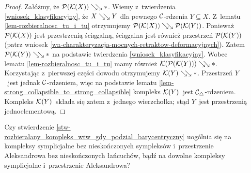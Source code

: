 \begin{proof}
Załóżmy, że $\mathcal{P}(\mathcal{K}(X))\searrow\!\!\searrow *$. Wiemy z~twierdzenia \ref{wniosek_klasyfikacyjny}, że $X\searrow\!\!\searrow Y$ dla pewnego $\mathcal{C}$-rdzenia $Y\subseteq X$. Z~lematu \ref{lem-rozbieralnosc_tu_i_tu} otrzymujemy $\mathcal{P}(\mathcal{K}(X))\searrow\!\!\searrow \mathcal{P}(\mathcal{K}(Y))$. Ponieważ $\mathcal{P}(\mathcal{K}(X))$ jest przestrzenią ściągalną, ściągalna jest również przestrzeń $\mathcal{P}(\mathcal{K}(Y))$ (patrz wniosek \ref{wn-charakteryzacja-mocnych-retraktow-deformacyjnych}). Zatem $\mathcal{P}(\mathcal{K}(Y))\searrow\!\!\searrow *$ na podstawie twierdzenia \ref{wniosek_klasyfikacyjny}. Wobec lematu \ref{lem-rozbieralnosc_tu_i_tu} mamy również $\mathcal{K}(\mathcal{P}(\mathcal{K}(Y)))\searrow\!\!\searrow *$. Korzystając z~pierwszej części dowodu otrzymujemy $\mathcal{K}(Y)\searrow\!\!\searrow *$. Przestrzeń $Y$~jest jednak $\mathcal{C}$-rdzeniem, więc na podstawie lematu \ref{lem-strong_collapsible_to_strong_collapsible} kompleks $\mathcal{K}(Y)$~jest $\mathcal{C}_\triangle$-rdzeniem. Kompleks $\mathcal{K}(Y)$~składa się zatem z~jednego wierzchołka; stąd $Y$~jest przestrzenią jednoelementową.
\end{proof}

\begin{problem}\label{prob4}
Czy stwierdzenie \ref{stw-rozbieralany_kompleks_wtw_gdy_podzial_barycentryczny} uogólnia się na kompleksy symplicjalne bez nieskończonych sympleksów i~przestrzenie Aleksandrowa bez nieskończonych łańcuchów, bądź na dowolne kompleksy symplicjalne i~przestrzenie Aleksandrowa?
\end{problem}


